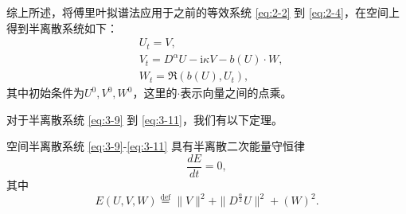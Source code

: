 综上所述，将傅里叶拟谱法应用于之前的等效系统 \eqref{eq:2-2} 到 \eqref{eq:2-4}，在空间上得到半离散系统如下：
\begin{align}
& U_t=V, \label{eq:3-9}\\
& V_t=D^{\alpha} U-\mathrm{i}\kappa V- b(U) \cdot W, \label{eq:3-10}\\
& W_t=\Re\left(b(U), U_t\right),\label{eq:3-11}
\end{align}
其中初始条件为$U^0, V^0, W^0$，这里的$\cdot$表示向量之间的点乘。

对于半离散系统 \eqref{eq:3-9} 到 \eqref{eq:3-11}，我们有以下定理。

\begin{theorem}	\label{thm3}
	空间半离散系统 \eqref{eq:3-9}-\eqref{eq:3-11} 具有半离散二次能量守恒律
	\begin{equation}
	\frac{dE}{dt}=0, \label{eq:313a}
	\end{equation}
	其中
	\begin{equation}
	E(U,V,W)\overset{\text{def}}{=}\|V\|^2 + \|D^\frac{\alpha}{2} U\|^2+\left(W\right)^2.\label{eq:313}
	\end{equation}
	\end{theorem}
	
